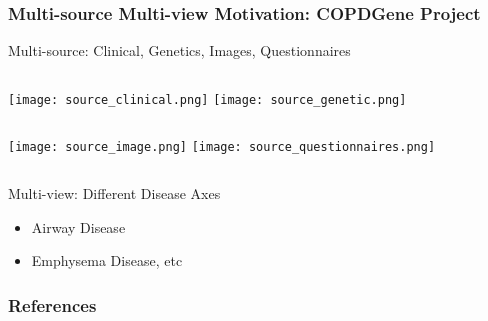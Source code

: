 \documentclass{beamer}
\begin{document}
\begin{frame}
\frametitle{Multi-source Multi-view Motivation: COPDGene Project}
\begin{block}{Multi-source: Clinical, Genetics, Images, Questionnaires}
	\begin{columns}
			\texttt{[image: source\_clinical.png]}
			\texttt{[image: source\_genetic.png]}
	\end{columns}
	\begin{columns}
		\column{.45\textwidth}
			\texttt{[image: source\_image.png]}
		\column{.45\textwidth}
			\texttt{[image: source\_questionnaires.png]}
	\end{columns}
\end{block}

\begin{block}{Multi-view: Different Disease Axes}
	\begin{itemize}
		\item{Airway Disease}
		\item{Emphysema Disease, etc}
	\end{itemize}
\end{block}

\end{frame}

\begin{frame}
\frametitle{References}
\end{frame}
\end{document}
